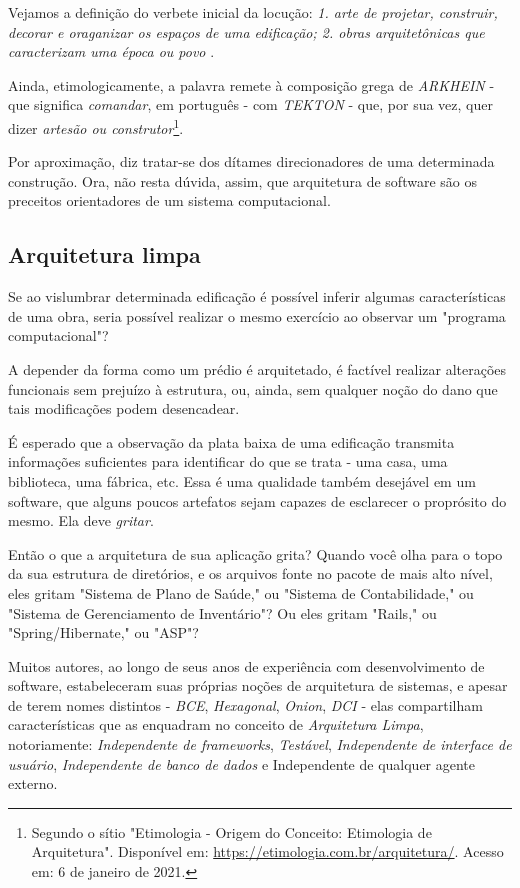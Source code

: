     Vejamos a definição do verbete inicial da locução: \emph{1. arte de projetar, construir, decorar e oraganizar os espaços de uma edificação; 2. obras arquitetônicas que caracterizam uma época ou povo} \cite[pág. 81]{Kury2007}.

    Ainda, etimologicamente, a palavra remete à composição grega de \emph{ARKHEIN} - que significa \emph{comandar}, em português - com \emph{TEKTON} - que, por sua vez, quer dizer \emph{artesão ou construtor}\footnote{Segundo o sítio "Etimologia - Origem do Conceito: Etimologia de Arquitetura". Disponível em: \url{https://etimologia.com.br/arquitetura/}. Acesso em: 6 de janeiro de 2021.}.

    Por aproximação, diz tratar-se dos dítames direcionadores de uma determinada construção. Ora, não resta dúvida, assim, que arquitetura de software são os preceitos orientadores de um sistema computacional.

  \subsection{Arquitetura limpa}

    Se ao vislumbrar determinada edificação é possível inferir algumas características de uma obra, seria possível realizar o mesmo exercício ao observar um "programa computacional"?

    A depender da forma como um prédio é arquitetado, é factível realizar alterações funcionais sem prejuízo à estrutura, ou, ainda, sem qualquer noção do dano que tais modificações podem desencadear.

    É esperado que a observação da plata baixa de uma edificação transmita informações suficientes para identificar do que se trata - uma casa, uma biblioteca, uma fábrica, etc. Essa é uma qualidade também desejável em um software, que alguns poucos artefatos sejam capazes de esclarecer o proprósito do mesmo. Ela deve \emph{gritar}.

  \citacaolonga
    {Então o que a arquitetura de sua aplicação grita? Quando você olha para o topo da sua estrutura de diretórios, e os arquivos fonte no pacote de mais alto nível, eles gritam "Sistema de Plano de Saúde," ou "Sistema de Contabilidade," ou "Sistema de Gerenciamento de Inventário"? Ou eles gritam "Rails," ou "Spring/Hibernate," ou "ASP"?}
    {\cite[pág. 196, tradução nossa]{Martin2018}}

  Muitos autores, ao longo de seus anos de experiência com desenvolvimento de software, estabeleceram suas próprias noções de arquitetura de sistemas, e apesar de terem nomes distintos - \emph{BCE}\cite{Jacobson1992}, \emph{Hexagonal}\cite{Cockburn2005}, \emph{Onion}\cite{Palermo2008}, \emph{DCI}\cite{Coplien2010} - elas compartilham características que as enquadram no conceito de \emph{Arquitetura Limpa}\cite{Martin2018}, notoriamente: \emph{Independente de frameworks}, \emph{Testável}, \emph{Independente de interface de usuário}, \emph{Independente de banco de dados} e {Independente de qualquer agente externo}.

